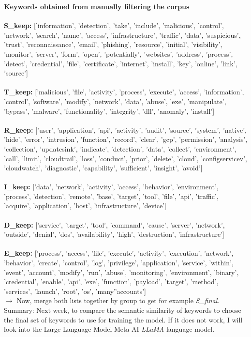 \textbf{Keywords obtained from manually filtering the corpus}\\\\
\textbf{S\_keep:} ['information', 'detection', 'take',  'include', 'malicious', 'control', 'network', 'search', 'name', 'access', 'infrastructure', 'traffic', 'data', 'suspicious', 'trust', 'reconnaissance', 'email', 'phishing', 'resource', 'initial', 'visibility', 'monitor', 'server', 'form', 'open', 'potentially', 'websites', 'address', 'process', 'detect', 'credential', 'file', 'certificate', 'internet', 'install', 'key', 'online', 'link', 'source'] \\\\
\textbf{T\_keep:} ['malicious', 'file', 'activity', 'process', 'execute', 'access', 'information', 'control', 'software', 'modify', 'network', 'data', 'abuse', 'exe', 'manipulate', 'bypass', 'malware', 'functionality', 'integrity', 'dll', 'anomaly', 'install'] \\\\
\textbf{R\_keep:} ['user', 'application', 'api', 'activity', 'audit', 'source', 'system', 'native', 'hide', 'error', 'intrusion', 'function', 'record', 'clear', 'gcp', 'permission', 'analysis', 'collection', 'updatesink', 'indicate', 'detection', 'data', 'collect', 'environment', 'call', 'limit', 'cloudtrail', 'loss', 'conduct', 'prior', 'delete', 'cloud', 'configservicev', 'cloudwatch', 'diagnostic', 'capability', 'sufficient', 'insight', 'avoid'] \\\\
\textbf{I\_keep:} ['data', 'network', 'activity', 'access', 'behavior', 'environment', 'process', 'detection', 'remote', 'base', 'target', 'tool', 'file', 'api', 'traffic', 'acquire', 'application', 'host', 'infrastructure', 'device'] \\\\
\textbf{D\_keep:} ['service', 'target', 'tool', 'command', 'cause', 'server', 'network', 'outside', 'denial', 'dos', 'availability', 'high', 'destruction', 'infrastructure'] \\\\
\textbf{E\_keep:} ['process', 'access', 'file', 'execute', 'activity', 'execution', 'network', 'behavior', 'create', 'control', 'log', 'privilege', 'application', 'service', 'within', 'event', 'account', 'modify', 'run', 'abuse', 'monitoring', 'environment', 'binary', 'credential', 'enable', 'api', 'exe', 'function', 'payload', 'target', 'method', 'services', 'launch', 'root', 'os', 'many''accounts'] \\

\(\rightarrow\) Now, merge both lists together by group to get for example \textit{S\_final}. \\

Summary: Next week, to compare the semantic similarity of keywords to choose the final set of keywords to use for training the model. If it does not work, I will look into the Large Language Model Meta AI \textit{LLaMA} language model.